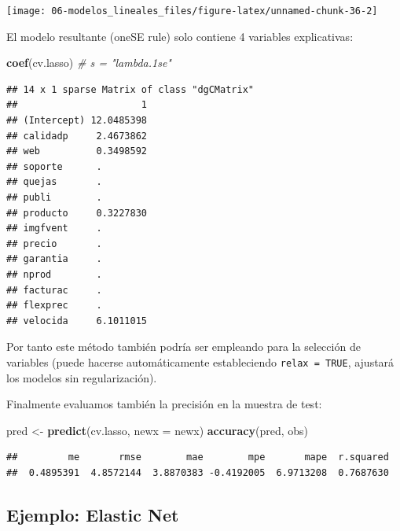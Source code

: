 \documentclass[
  spanish,
]{book}
\newenvironment{Shaded}{\begin{snugshade}}{\end{snugshade}}
\newcommand{\CommentTok}[1]{\textcolor[rgb]{0.56,0.35,0.01}{\textit{#1}}}
\newcommand{\DataTypeTok}[1]{\textcolor[rgb]{0.13,0.29,0.53}{#1}}
\newcommand{\KeywordTok}[1]{\textcolor[rgb]{0.13,0.29,0.53}{\textbf{#1}}}
\newcommand{\NormalTok}[1]{#1}
\newcommand{\StringTok}[1]{\textcolor[rgb]{0.31,0.60,0.02}{#1}}
\theoremstyle{break}
\theoremstyle{definition}
\theoremstyle{definition}
\theoremstyle{definition}
\theoremstyle{remark}
\begin{document}
\begin{center}\texttt{[image: 06-modelos\_lineales\_files/figure-latex/unnamed-chunk-36-2]} \end{center}

El modelo resultante (oneSE rule) solo contiene 4 variables explicativas:

\begin{Shaded}
\begin{Highlighting}[]
\KeywordTok{coef}\NormalTok{(cv.lasso) }\CommentTok{# s = "lambda.1se"}
\end{Highlighting}
\end{Shaded}

\begin{verbatim}
## 14 x 1 sparse Matrix of class "dgCMatrix"
##                      1
## (Intercept) 12.0485398
## calidadp     2.4673862
## web          0.3498592
## soporte      .        
## quejas       .        
## publi        .        
## producto     0.3227830
## imgfvent     .        
## precio       .        
## garantia     .        
## nprod        .        
## facturac     .        
## flexprec     .        
## velocida     6.1011015
\end{verbatim}

Por tanto este método también podría ser empleando para la selección de variables (puede hacerse automáticamente estableciendo \texttt{relax\ =\ TRUE}, ajustará los modelos sin regularización).

Finalmente evaluamos también la precisión en la muestra de test:

\begin{Shaded}
\begin{Highlighting}[]
\NormalTok{pred <-}\StringTok{ }\KeywordTok{predict}\NormalTok{(cv.lasso, }\DataTypeTok{newx =}\NormalTok{ newx)}
\KeywordTok{accuracy}\NormalTok{(pred, obs)}
\end{Highlighting}
\end{Shaded}

\begin{verbatim}
##         me       rmse        mae        mpe       mape  r.squared 
##  0.4895391  4.8572144  3.8870383 -0.4192005  6.9713208  0.7687630
\end{verbatim}

\hypertarget{ejemplo-elastic-net}{%
\subsection{Ejemplo: Elastic Net}\label{ejemplo-elastic-net}}
\end{document}
